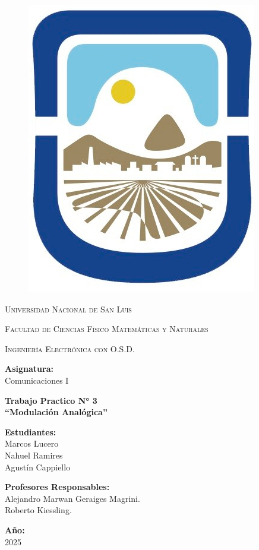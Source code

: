 \documentclass[11pt,a4paper]{article}
\begin{document}
    \begin{titlepage}	  
    		\centering
    		
    		\begin{figure}
    			\centering
    			\includegraphics[width=0.15\linewidth]{caratula/logo-unsl.jpg}
    		\end{figure}     
    		
    		{\scshape\LARGE Universidad Nacional de San Luis\\}
    		{\scshape Facultad de Ciencias Físico Matemáticas y Naturales\par}
    		{\scshape Ingeniería Electrónica con O.S.D.\par}
    		\vspace{2cm} 
    		
    		\Large \textbf {Asignatura:\\} 
    		\bigskip
    		\LARGE {\Huge Comunicaciones I}
    		\vspace{0.3cm}
    		
    		\LARGE \textbf {Trabajo Practico N° 3\\} 
    		\vspace{0.7cm}
    		\LARGE \textbf {“Modulación Analógica”}

    		\vspace{2cm}
    		\LARGE \textbf {Estudiantes:\\} 
    		\LARGE Marcos Lucero \\ Nahuel Ramires\\ Agustín Cappiello\\
    		\bigskip
    		
    		
    		\vspace{1cm}
    		
    		\Large \textbf {Profesores Responsables:\\} 
    		\bigskip
    		\Large Alejandro Marwan Geraiges Magrini. \\ Roberto Kiessling.
    		
    		
    		\vspace{3cm}
    		
    		\Large \textbf {Año:\\} 
    		\Large 2025	
    	\end{titlepage}
    
\end{document}
